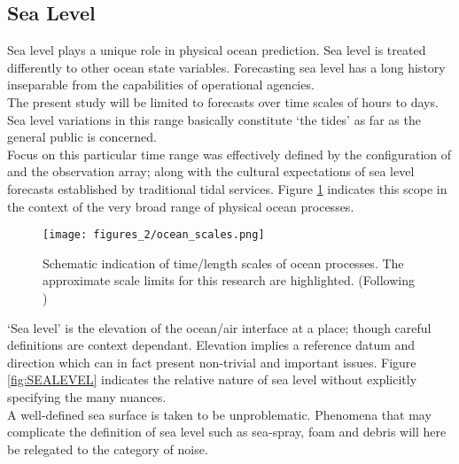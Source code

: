 \subsection{Sea Level}
Sea level plays a unique role in physical ocean prediction. 
Sea level is treated differently to other ocean state variables.  Forecasting sea level has a long history inseparable from the capabilities of operational agencies.\\




The present study will be limited to forecasts over time scales of hours to days. Sea level variations in this range basically constitute `the tides' as far as the general public is concerned.\\
Focus on this particular time range was effectively defined by the configuration of \BL{} and the observation array; along with the cultural expectations of sea level forecasts established by traditional tidal services.  Figure \ref{fig:SCALES} indicates this scope in the context of the very broad range of physical ocean processes.    


\begin{figure}[!h]
\begin{center}
\texttt{[image: figures\_2/ocean\_scales.png]}
\caption{Schematic indication of time/length scales of ocean processes.  The approximate scale limits for this research are highlighted. (Following \citet{Chelton:2001ws} )}
\label{fig:SCALES}
\end{center}
\end{figure}

`Sea level' is the elevation of the ocean/air interface at a place; though careful definitions are context dependant.  Elevation implies a reference datum and direction which can in fact present non-trivial and important issues.   Figure \ref{fig:SEALEVEL} indicates the relative nature of sea level without explicitly specifying the many nuances. \\
A well-defined sea surface is taken to be unproblematic.  Phenomena that may complicate the definition of sea level such as sea-spray, foam and debris will here be relegated to the category of noise.\\




